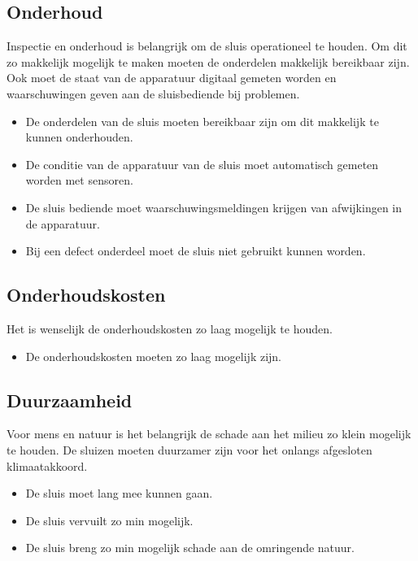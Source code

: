 \documentclass[../verslag.tex]{subfiles}
\begin{document}
\subsection{Onderhoud}
Inspectie en onderhoud is belangrijk om de sluis operationeel te houden. Om dit zo makkelijk mogelijk te maken moeten de onderdelen makkelijk bereikbaar zijn. Ook moet de staat van de apparatuur digitaal gemeten worden en waarschuwingen geven aan de sluisbediende bij problemen.
\begin{itemize}
    \item De onderdelen van de sluis moeten bereikbaar zijn om dit makkelijk te kunnen onderhouden.
    \item De conditie van de apparatuur van de sluis moet automatisch gemeten worden met sensoren.
    \item De sluis bediende moet waarschuwingsmeldingen krijgen van afwijkingen in de apparatuur.
    \item Bij een defect onderdeel moet de sluis niet gebruikt kunnen worden.
\end{itemize}

\subsection{Onderhoudskosten}
Het is wenselijk de onderhoudskosten zo laag mogelijk te houden.
\begin{itemize}
    \item De onderhoudskosten moeten zo laag mogelijk zijn.
\end{itemize}

\subsection{Duurzaamheid}
Voor mens en natuur is het belangrijk de schade aan het milieu zo klein mogelijk te houden. De sluizen moeten duurzamer zijn voor het onlangs afgesloten klimaatakkoord.
\begin{itemize}
    \item De sluis moet lang mee kunnen gaan.
    \item De sluis vervuilt zo min mogelijk.
    \item De sluis breng zo min mogelijk schade aan de omringende natuur.
\end{itemize}
\end{document}
